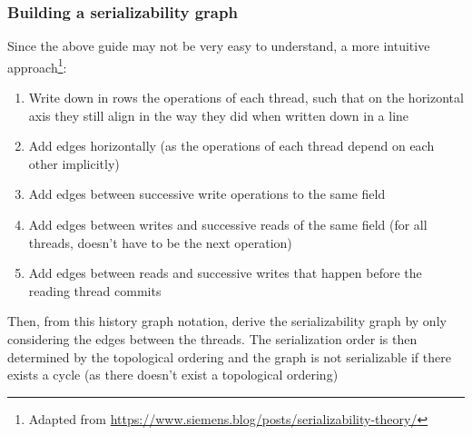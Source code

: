\subsubsection{Building a serializability graph}
Since the above guide may not be very easy to understand, a more intuitive approach\footnote{Adapted from \url{https://www.siemens.blog/posts/serializability-theory/}}:
\begin{enumerate}
    \item Write down in rows the operations of each thread, such that on the horizontal axis they still align in the way they did when written down in a line
    \item Add edges horizontally (as the operations of each thread depend on each other implicitly)
    \item Add edges between successive write operations to the same field
    \item Add edges between writes and successive reads of the same field (for all threads, doesn't have to be the next operation)
    \item Add edges between reads and successive writes that happen before the reading thread commits
\end{enumerate}
Then, from this history graph notation, derive the serializability graph by only considering the edges between the threads.
The serialization order is then determined by the topological ordering and the graph is not serializable if there exists a cycle
(as there doesn't exist a topological ordering)
